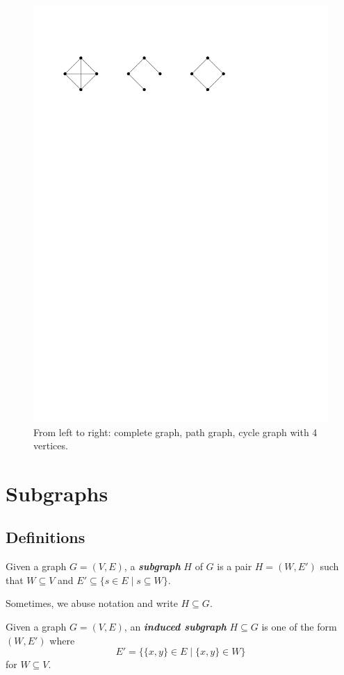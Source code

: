 \begin{figure}[htbp]
    \centering
    \includegraphics[width=0.6\linewidth]{figures/classic-graphs.pdf}
    \caption{From left to right: complete graph, path graph, cycle graph with 4 vertices.}
    \label{fig:classic-graphs}
\end{figure}

\section{Subgraphs}

\subsection{Definitions}

\begin{definition}[Subgraph]
    Given a graph $G = (V,E)$, a \textit{\textbf{subgraph}} $H$ of $G$ is a pair $H = (W,E')$ such that $W \subseteq V$ and $E' \subseteq \{s \in E \mid s \subseteq W\}$.
\end{definition}

Sometimes, we abuse notation and write $H \subseteq G$.

\begin{definition}
    Given a graph $G = (V,E)$, an \textit{\textbf{induced subgraph}} $H \subseteq G$ is one of the form $(W,E')$ where
    $$
    E' = \{ \{x,y\} \in E \mid \{x,y\} \in W\}
    $$
    for $W \subseteq V$.
\end{definition}

